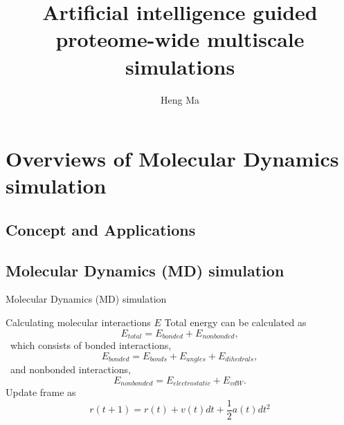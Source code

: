 \documentclass{beamer}
\title{Artificial intelligence guided proteome-wide multiscale simulations}
\author{Heng Ma}
\institute{Oak Ridge National Laboratory\\ Oak Ridge, Tennessee 37830}
\date{}
\begin{document}
\begin{frame}
  \titlepage
\end{frame}

\begin{frame}
  \tableofcontents
\end{frame}



\section{Overviews of Molecular Dynamics simulation }

\subsection{Concept and Applications}

\subsection{Molecular Dynamics (MD) simulation}
\begin{frame}{Molecular Dynamics (MD) simulation}
\centering
{}
\end{frame}

\begin{frame}{Calculating molecular interactions $E$}
Total energy can be calculated as
\begin{equation}
E_{total} = E_{bonded} + E_{nonbonded}, 
\end{equation}
\ which consists of bonded interactions, 
\begin{equation} 
E_{bonded} = E_{bonds} + E_{angles} + E_{dihedrals}, 
\end{equation}
\ and nonbonded interactions, 
\begin{equation}
E_{nonbonded} = E_{electrostatic} + E_{vdW}. 
\end{equation}
Update frame as 
\begin{equation}
r(t+1) = r(t) + v(t) dt + \frac{1}{2} a(t) dt^2
\end{equation}
\end{frame}
\end{document}
